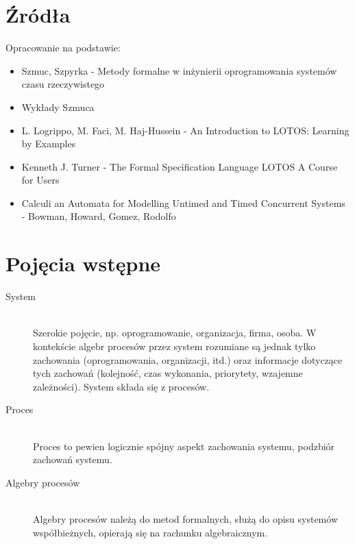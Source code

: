 \documentclass[a4paper,15pt]{article}
\begin{document}
\section{Źródła}
Opracowanie na podstawie:
\begin{itemize}
\item Szmuc, Szpyrka - Metody formalne w inżynierii oprogramowania systemów czasu rzeczywistego
\item Wykłady Szmuca
\item L. Logrippo, M. Faci, M. Haj-Hussein - An Introduction to LOTOS:  Learning by Examples
\item Kenneth J. Turner - The Formal Specification Language LOTOS A Course for Users
\item Calculi an Automata for Modelling Untimed and Timed Concurrent Systems - Bowman, Howard, Gomez, Rodolfo 
\end{itemize}



\newpage
\section{Pojęcia wstępne}

\begin{description}

\item[System] \hfill \\ 
Szerokie pojęcie, np. oprogramowanie, organizacja, firma, osoba. W kontekście algebr procesów przez system rozumiane są jednak tylko zachowania (oprogramowania, organizacji, itd.) oraz informacje dotyczące tych zachowań (kolejność, czas wykonania, priorytety, wzajemne zależności). System składa się z procesów.

\item[Proces] \hfill \\ 
Proces to pewien logicznie spójny aspekt zachowania systemu, podzbiór zachowań systemu.

\item[Algebry procesów] \hfill \\
Algebry procesów należą do metod formalnych, służą do opisu systemów współbieżnych, opierają się na rachunku algebraicznym.

\end{description}
\end{document}
